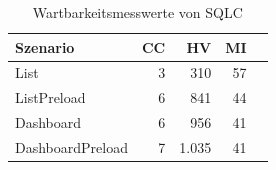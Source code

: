 \begin{table}[ht]
\centering
\caption{Wartbarkeitsmesswerte von SQLC}
\begin{tabular}{lrrrr}
\toprule
Szenario & CC & HV & MI \\
\midrule
	List & 3 & 310 & 57 \\
	ListPreload & 6 & 841 & 44 \\
	Dashboard & 6 & 956 & 41 \\
	DashboardPreload & 7 & 1.035 & 41 \\
\bottomrule
\end{tabular}
\label{tab:wartbarkeit_sqlc}
\end{table}
	